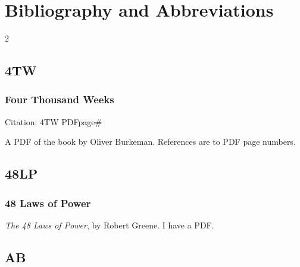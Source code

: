 \section{Bibliography and Abbreviations}
	\label{BIBLIOGRAPHY}
	

\begin{multicols}{2}

	\subsection*{4TW}
	
		\subsubsection{Four Thousand Weeks}
		
			Citation:
				4TW PDFpage\#
		
			A PDF of the book by Oliver Burkeman. References are to PDF page numbers.
			
	\subsection*{48LP}
	
		\subsubsection*{48 Laws of Power}
		
			\textit{The 48 Laws of Power}, by Robert Greene. I have a PDF.

	\subsection*{AB}
	

\end{multicols}
